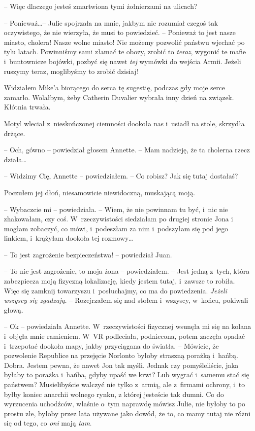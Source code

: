 \documentclass[oneside,polish,11pt,sfheadings]{mwbk}
\begin{document}
-- Więc dlaczego jesteś zmartwiona tymi żołnierzami na ulicach?

-- Ponieważ\ldots -- Julie spojrzała na mnie, jakbym nie rozumiał czegoś tak
oczywistego, że nie wierzyła, że musi to powiedzieć. -- Ponieważ to jest
nasze miasto, cholera! Nasze wolne miasto! Nie możemy pozwolić państwu
wjechać po tylu latach. Powinniśmy sami złamać te obozy, zrobić to
\emph{teraz}, wygonić te mafie i~buntownicze bojówki, pozbyć się nawet
\emph{tej} wymówki do wejścia Armii. Jeżeli ruszymy teraz, moglibyśmy to
zrobić dzisiaj!

Widziałem Mike'a biorącego do serca tę sugestię, podczas gdy moje serce
zamarło. Wolałbym, żeby Catherin Duvalier wybrała inny dzień na związek.
Kłótnia trwała.

Motyl wleciał z~nieskończonej ciemności dookoła nas i~usiadł na stole,
skrzydła drżące.

-- Och, gówno -- powiedział głosem Annette. -- Mam nadzieję, że ta cholerna
rzecz działa\ldots

-- Widzimy Cię, Annette -- powiedziałem. -- Co robisz? Jak się tutaj
dostałaś?

Poczułem jej dłoń, niesamowicie niewidoczną, muskającą moją.

-- Wybaczcie mi -- powiedziała. -- Wiem, że nie powinnam tu być, i~nic nie
zhakowałam, czy coś. W~rzeczywistości siedziałam po drugiej stronie Jona
i mogłam zobaczyć, co mówi, i~podeszłam za nim i~podszyłam się pod jego
linkiem, i~krążyłam dookoła tej rozmowy\ldots

-- To jest zagrożenie bezpieczeństwa! -- powiedział Juan.

-- To nie jest zagrożenie, to moja żona -- powiedziałem. -- Jest jedną z~tych, która zabezpiecza moją fizyczną lokalizację, kiedy jestem tutaj, i~zawsze to robiła. Więc się zamknij towarzyszu i~posłuchajmy, co ma do
powiedzenia. \emph{Jeżeli wszyscy się zgadzają}. -- Rozejrzałem się nad
stołem i~wszyscy, w~końcu, pokiwali głową.

-- Ok -- powiedziała Annette. W~rzeczywistości fizycznej wsunęła mi się na
kolana i~objęła mnie ramieniem. W~VR podleciała, podniecona, potem
zaczęła opadać i~trzepotać dookoła mapy, jakby przyciągana do światła. -- Mówicie, że pozwolenie Republice na przejęcie Norlonto byłoby straszną
porażką i~hańbą. Dobra. Jestem pewna, że nawet Jon tak myśli. Jednak czy
pomyśleliście, jaka byłaby to porażka i~hańba, gdyby upaść we krwi? Lub
wygrać i~samemu stać się państwem? Musielibyście walczyć nie tylko z~armią, ale z~firmami ochrony, i~to byłby koniec anarchii wolnego rynku,
z której jesteście tak dumni. Co do wyrzucenia uchodźców, właśnie o~tym
naprawdę mówisz Julie, nie byłoby to po prostu złe, byłoby przez lata
używane jako dowód, że to, co mamy tutaj nie różni się od tego, co
\emph{oni} mają \emph{tam}.
\end{document}
